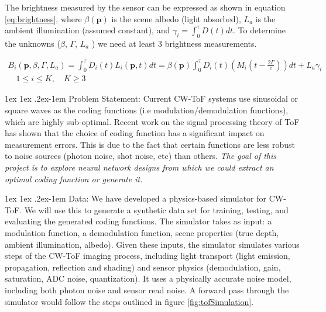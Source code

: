 \documentclass[12pt]{article}
\makeatletter
\def \p {\mathbf{p}}
\renewcommand{\paragraph}{%
  \@startsection{paragraph}{4}%
  {\z@}{1ex \@plus 1ex \@minus .2ex}{-1em}%
  {\normalfont\normalsize\bfseries}%
}
\makeatother
\begin{document}
The brightness measured by the sensor can be expressed as shown in equation \ref{eq:brightness}, where $\beta(\p)$ is the scene albedo (light absorbed), 
$L_a$ is the ambient illumination (assumed constant), and $\gamma_i = \int_{0}^{\tau} D(t)dt$. 
To determine the unknowns ($\beta$, $\Gamma$, $L_a$ ) we need at least 3 brightness measurements. 

\begin{gather} \label{eq:brightness}
    B_{i}(\p,\beta,\Gamma,L_a) = \int_{0}^{\tau} D_i(t)L_i(\p,t) dt = \beta(\p) \int_{0}^{\tau} D_i(t)(M_i(t - \frac{2\Gamma}{c})) dt + L_a\gamma_i \\
    \quad 1 \leq i \leq K, \quad K \geq 3
\end{gather}



\paragraph{Problem Statement:} Current CW-ToF systems use sinusoidal or square waves as the coding functions (i.e modulation/demodulation functions), which are highly sub-optimal. Recent work on the signal processing theory of ToF has shown that the choice of coding function has a significant impact on measurement errors. This is due to the fact that certain functions are less robust to noise sources (photon noise, shot noise, etc) than others. \textit{The goal of this project is to explore neural network designs from which we could extract an optimal coding function or generate it.}

\paragraph{Data:} We have developed a physics-based simulator for CW-ToF. We will use this to generate a synthetic data set for training, testing, and evaluating the generated coding functions. The simulator takes as input: a modulation function, a demodulation function, scene properties (true depth, ambient illumination, albedo).%
 Given these inputs, the simulator simulates various steps of the CW-ToF imaging process, including light transport (light emission, propagation, reflection and shading) and sensor physics (demodulation, gain, saturation, ADC noise, quantization). It uses a physically accurate  noise model, including both photon noise and sensor read noise. A forward pass through the simulator would follow the steps outlined in figure \ref{fig:tofSimulation}.  
\end{document}
